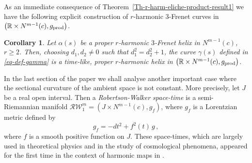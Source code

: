 \documentclass[11pt]{amsart}
\theoremstyle{plain}
\newtheorem{corollary}    [theorem]  {Corollary}
\theoremstyle{definition}
\numberwithin{equation}{section}
\def \R{{\mathbb R}}
\begin{document}
As an immediate consequence of Theorem~\ref{Th-r-harm-eliche-product-result1} we have the following explicit construction of $r$-harmonic $3$-Frenet curves in $\left ( \R \times N^{m-1}(c),g_{{\rm prod}}\right )$.
\begin{corollary}
Let $\alpha(s)$ be a proper $r$-harmonic $3$-Frenet helix in $N^{m-1}(c)$, $r \geq 2$. Then, choosing $d_1,d_2\neq 0$ such that $d_1^2=d_2^2+1$, the curve $\gamma(s)$ defined in \eqref{eq-def-gamma} is a time-like, proper $r$-harmonic helix in $\left ( \R \times N^{m-1}(c),g_{{\rm prod}}\right )$.
\end{corollary}

In the last section of the paper we shall analyse another important case where the sectional curvature of the ambient space is not constant. More precisely, let $J$ be a real open interval. Then a \textit{Robertson-Walker space-time} is a semi-Riemannian manifold $\mathcal{RW}^{m}_1 =\left ( J \times N^{m-1}(c),g_f\right )$, where  $g_f$ is a Lorentzian metric  defined by
\begin{equation}\label{eq-gf-walker}
g_f = -dt^2 + f^2(t) \, g\,,
\end{equation}
where $f$ is a smooth positive function on $J$. These space-times, which are largely used in theoretical physics and in the study of cosmological phenomena, appeared for the first time in the context of harmonic maps in \cite{MR1035340}. 
\end{document}
